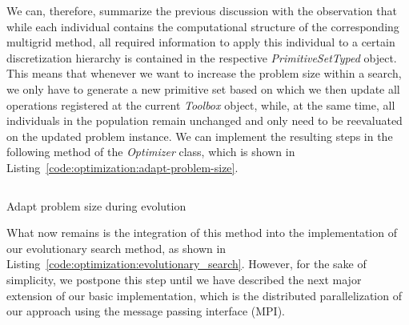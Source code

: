 We can, therefore, summarize the previous discussion with the observation that while each individual contains the computational structure of the corresponding multigrid method, all required information to apply this individual to a certain discretization hierarchy is contained in the respective \emph{PrimitiveSetTyped} object.
This means that whenever we want to increase the problem size within a search, we only have to generate a new primitive set based on which we then update all operations registered at the current \emph{Toolbox} object, while, at the same time, all individuals in the population remain unchanged and only need to be reevaluated on the updated problem instance.
We can implement the resulting steps in the following method of the \emph{Optimizer} class, which is shown in Listing~\ref{code:optimization:adapt-problem-size}.
\begin{listing}
	\inputminted[linenos]{python}{evostencils/optimization/adapt_problem_size.py}
	\caption{Adapt problem size during evolution}
	\label{code:optimization:adapt-problem-size}
\end{listing}
What now remains is the integration of this method into the implementation of our evolutionary search method, as shown in Listing~\ref{code:optimization:evolutionary_search}.
However, for the sake of simplicity, we postpone this step until we have described the next major extension of our basic implementation, which is the distributed parallelization of our approach using the message passing interface (MPI).

